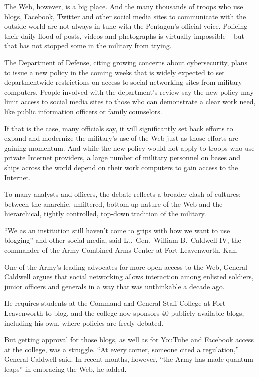 ﻿\documentclass[12pt]{article}
\begin{document}
The Web, however, is a big place. And the many thousands of troops who use blogs, Facebook, Twitter
and other social media sites to communicate with the outside world are not always in tune with the
Pentagon's official voice. Policing their daily flood of posts, videos and photographs is virtually
impossible -- but that has not stopped some in the military from trying.

The Department of Defense, citing growing concerns about cybersecurity, plans to issue a new policy
in the coming weeks that is widely expected to set departmentwide restrictions on access to social
networking sites from military computers. People involved with the department's review say the new
policy may limit access to social media sites to those who can demonstrate a clear work need, like
public information officers or family counselors.

If that is the case, many officials say, it will significantly set back efforts to expand and
modernize the military's use of the Web just as those efforts are gaining momentum. And while the
new policy would not apply to troops who use private Internet providers, a large number of military
personnel on bases and ships across the world depend on their work computers to gain access to the
Internet.

To many analysts and officers, the debate reflects a broader clash of cultures: between the
anarchic, unfiltered, bottom-up nature of the Web and the hierarchical, tightly controlled, top-down
tradition of the military.

``We as an institution still haven't come to grips with how we want to use blogging'' and other
social media, said Lt.~Gen.~William B.~Caldwell IV, the commander of the Army Combined Arms Center
at Fort Leavenworth, Kan.

One of the Army's leading advocates for more open access to the Web, General Caldwell argues that
social networking allows interaction among enlisted soldiers, junior officers and generals in a way
that was unthinkable a decade ago.

He requires students at the Command and General Staff College at Fort Leavenworth to blog, and the
college now sponsors 40 publicly available blogs, including his own, where policies are freely
debated.

But getting approval for those blogs, as well as for YouTube and Facebook access at the college, was
a struggle. ``At every corner, someone cited a regulation,'' General Caldwell said. In recent
months, however, ``the Army has made quantum leaps'' in embracing the Web, he added.
\end{document}
